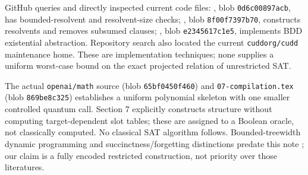 \documentclass[11pt]{article}
\begin{document}
GitHub queries and directly inspected current code files: , blob \texttt{0d6c00897acb}, has bounded-resolvent and resolvent-size checks; , blob \texttt{8f00f7397b70}, constructs resolvents and removes subsumed clauses; , blob \texttt{e2345617c1e5}, implements BDD existential abstraction. Repository search also located the current \texttt{cuddorg/cudd} maintenance home. These are implementation techniques; none supplies a uniform worst-case bound on the exact projected relation of unrestricted SAT.

The actual \texttt{openai/math} source  (blob \texttt{65bf0450f460}) and \texttt{07-compilation.tex} (blob \texttt{869be8c325}) establishes a uniform polynomial skeleton with one smaller controlled quantum call. Section 7 explicitly constructs structure without computing target-dependent slot tables; these are assigned to a Boolean oracle, not classically computed. No classical SAT algorithm follows. Bounded-treewidth dynamic programming and succinctness/forgetting distinctions predate this note \cite{samer2010,darwiche2002,nrs2004}; our claim is a fully encoded restricted construction, not priority over those literatures.
\end{document}
